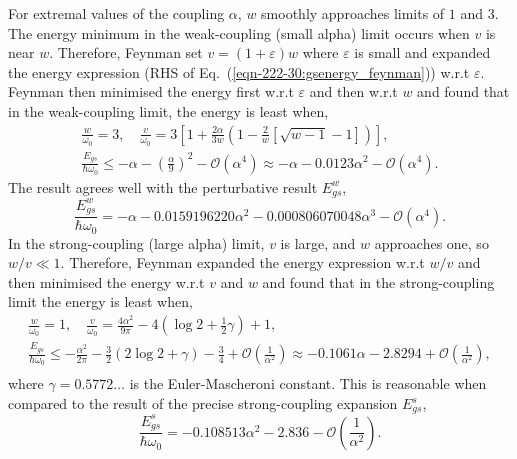 For extremal values of the coupling $\alpha$, $w$ smoothly approaches limits of $1$ and $3$. The energy minimum in the weak-coupling (small alpha) limit occurs when $v$ is near $w$. Therefore, Feynman set $v = (1 + \varepsilon) w$ where $\varepsilon$ is small and expanded the energy expression (RHS of Eq.~(\ref{eqn-222-30:gsenergy_feynman})) w.r.t $\varepsilon$. Feynman then minimised the energy first w.r.t $\varepsilon$ and then w.r.t $w$ and found that in the weak-coupling limit, the energy is least when,
\begin{equation}
\begin{gathered}
    \frac{w}{\omega_0} = 3, \quad \frac{v}{\omega_0} = 3 \left[ 1 + \frac{2\alpha}{3w} \left(1 -\frac{2}{w} \left[ \sqrt{w-1}-1 \right] \right) \right] ,\\
    \frac{E_{gs}}{\hbar\omega_0} \leq -\alpha - \left(\frac{\alpha}{9}\right)^2 - \mathcal{O}\left(\alpha^4\right) \approx -\alpha - 0.0123 \alpha^2 - \mathcal{O}\left(\alpha^4\right) .
\end{gathered}
\label{eqn-2221-1:weak_gs_feynman}
\end{equation}
The result agrees well with the perturbative result $E^w_{gs}$,
\begin{equation}
    \frac{E^w_{gs}}{\hbar\omega_0} = -\alpha - 0.0159196220 \alpha^2 - 0.000806070048 \alpha^3 - \mathcal{O}\left(\alpha^4\right) .
\label{eqn-2222-13}
\end{equation}
In the strong-coupling (large alpha) limit, $v$ is large, and $w$ approaches one, so $w / v \ll 1$. Therefore, Feynman expanded the energy expression w.r.t $w / v$ and then minimised the energy w.r.t $v$ and $w$ and found that in the strong-coupling limit the energy is least when,
\begin{equation}
\begin{gathered}
    \frac{w}{\omega_0} = 1, \quad \frac{v}{\omega_0} = \frac{4\alpha^2}{9\pi} - 4\left( \log2 + \frac{1}{2} \gamma \right) + 1 , \\
    \frac{E_{gs}}{\hbar\omega_0} \leq -\frac{\alpha^2}{2\pi} - \frac{3}{2}(2\log2+\gamma)-\frac{3}{4} + \mathcal{O}\left(\frac{1}{\alpha^2}\right) \approx -0.1061\alpha - 2.8294 + \mathcal{O}\left(\frac{1}{\alpha^2}\right) , \\
\end{gathered}
\label{eqn-2221-2:strong_gs_feynman}
\end{equation}
where $\gamma = 0.5772 \dots$ is the Euler-Mascheroni constant. This is reasonable when compared to the result of the precise strong-coupling expansion $E^s_{gs}$,
\begin{equation}
    \frac{E^s_{gs}}{\hbar\omega_0} = -0.108513 \alpha^2 - 2.836 - \mathcal{O}\left(\frac{1}{\alpha^2}\right).
\label{eqn-2222-16}
\end{equation}

